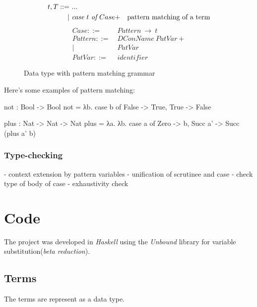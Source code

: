 \documentclass[
       embeddedlogo,
       english,
       lmodern,
       coorientadorbanca,
       noabntexcite
]{ufsc-thesis-rn46-2019}
\theoremstyle{definition}
\begin{document}
\begin{figure}[H]
       \[
              \begin{aligned}
                     t, T ::= & \ ... \\
                     |        & \ \emph{case}\ t\ \emph{of}\ Case+ & \text{pattern matching of a term}
              \end{aligned}
       \]
       \[
              \begin{aligned}
                     Case      ::= & \ Pattern\ \rightarrow\ t \\
                     Pattern   ::= & \ DConName\ PatVar+ \\
                     |             & \ PatVar   \\
                     PatVar    ::= & \ identifier
              \end{aligned}
       \]
       \caption{Data type with pattern matching grammar}
\end{figure}

Here's some examples of pattern matching:

\begin{piforall}
not : Bool -> Bool
not = λb. case b of {
  False -> True,
  True -> False
}

plus : Nat -> Nat -> Nat
plus = λa. λb. case a of {
  Zero -> b,
  Succ a' -> Succ (plus a' b)
}
\end{piforall}

\subsubsection{Type-checking}

- context extension by pattern variables
- unification of scrutinee and case
- check type of body of case
- exhaustivity check

\section{Code}

The project was developed in \emph{Haskell} using the \emph{Unbound} library for variable substitution(\emph{beta reduction}).

\subsection{Terms}

The terms are represent as a data type.
\end{document}
